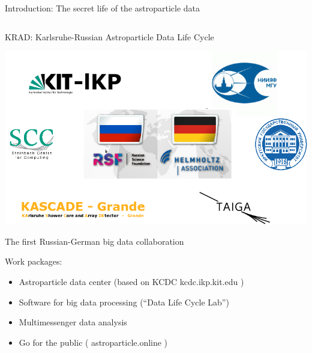 \documentclass[18pt]{beamer}
\begin{document}
\begin{frame}{Introduction: The secret life of the astroparticle data}
\begin{columns}
\begin{column}[t]{0.53\textwidth}
  \end{column}
\end{columns}
  \footnotesize{}
\end{frame}

\begin{frame}{\textcolor{kit-green100}{KRAD}: \textcolor{kit-green100}{K}arlsruhe-\textcolor{kit-green100}{R}ussian \textcolor{kit-green100}{A}stroparticle \textcolor{kit-green100}{D}ata Life Cycle}
\begin{center}
  \includegraphics[width=0.9\linewidth]{pics/Collab.png}
\end{center}
\vspace{-2\parsep}
The first Russian-German big data collaboration

\end{frame}

\begin{frame}
Work packages:
\begin{itemize}
 \item Astroparticle data center (based on KCDC kcdc.ikp.kit.edu )
 \item Software for big data processing (“Data Life Cycle Lab”)
 \item Multimessenger data analysis
 \item Go for the public ( astroparticle.online )
\end{itemize}
\end{frame}
\end{document}
